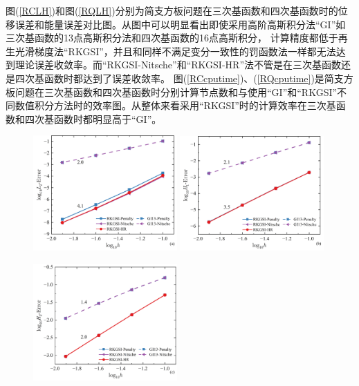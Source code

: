  图(\ref{RCLH})和图(\ref{RQLH})分别为简支方板问题在三次基函数和四次基函数时的位移误差和能量误差对比图。从图中可以明显看出即使采用高阶高斯积分法“GI”如三次基函数的13点高斯积分法和四次基函数的16点高斯积分，
计算精度都低于再生光滑梯度法“RKGSI”，并且和同样不满足变分一致性的罚函数法一样都无法达到理论误差收敛率。而“RKGSI-Nitsche”和“RKGSI-HR”法不管是在三次基函数还是四次基函数时都达到了误差收敛率。
图(\ref{RCcputime})、(\ref{RQcputime})是简支方板问题在三次基函数和四次基函数时分别计算节点数和与使用“GI”和“RKGSI”不同数值积分方法时的效率图。从整体来看采用“RKGSI”时的计算效率在三次基函数和四次基函数时都明显高于“GI”。  
\newpage
\begin{figure}[H]
    \centering
    \begin{subcaptiongroup}
    \includegraphics[width=0.49\textwidth]{figure/PHR/R/CL2.png}
    \label{CL2}
    \includegraphics[width=0.49\textwidth]{figure/PHR/R/CH1.png}
    \label{CH1}
    \end{subcaptiongroup}
    \begin{subcaptiongroup}
    \includegraphics[width=0.49\textwidth]{figure/PHR/R/CH2.png}

\end{subcaptiongroup}
\end{figure}
